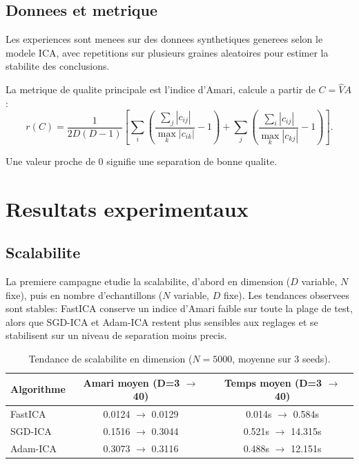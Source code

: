 \documentclass[11pt,a4paper]{article}
\begin{document}
\subsection{Donnees et metrique}

Les experiences sont menees sur des donnees synthetiques generees selon le modele ICA, avec repetitions sur plusieurs graines aleatoires pour estimer la stabilite des conclusions.

La metrique de qualite principale est l'indice d'Amari, calcule a partir de $C=\hat V A$:
\begin{equation}
r(C)=\frac{1}{2D(D-1)}\left[\sum_i\left(\frac{\sum_j|c_{ij}|}{\max_k|c_{ik}|}-1\right)+\sum_j\left(\frac{\sum_i|c_{ij}|}{\max_k|c_{kj}|}-1\right)\right].
\end{equation}

Une valeur proche de 0 signifie une separation de bonne qualite.

\section{Resultats experimentaux}

\subsection{Scalabilite}

La premiere campagne etudie la scalabilite, d'abord en dimension ($D$ variable, $N$ fixe), puis en nombre d'echantillons ($N$ variable, $D$ fixe). Les tendances observees sont stables: FastICA conserve un indice d'Amari faible sur toute la plage de test, alors que SGD-ICA et Adam-ICA restent plus sensibles aux reglages et se stabilisent sur un niveau de separation moins precis.

\begin{table}[h]
\centering
\begin{tabular}{lcc}
\toprule
Algorithme & Amari moyen (D=3 $\rightarrow$ 40) & Temps moyen (D=3 $\rightarrow$ 40) \\
\midrule
FastICA & 0.0124 $\rightarrow$ 0.0129 & 0.014s $\rightarrow$ 0.584s \\
SGD-ICA & 0.1516 $\rightarrow$ 0.3044 & 0.521s $\rightarrow$ 14.315s \\
Adam-ICA & 0.3073 $\rightarrow$ 0.3116 & 0.488s $\rightarrow$ 12.151s \\
\bottomrule
\end{tabular}
\caption{Tendance de scalabilite en dimension ($N=5000$, moyenne sur 3 seeds).}
\end{table}
\end{document}
